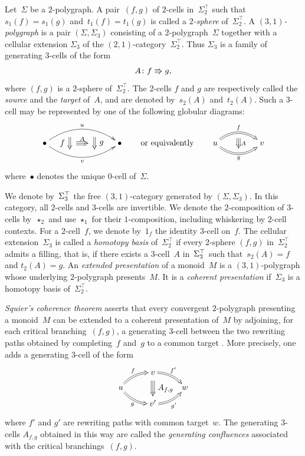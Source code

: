 \documentclass[a4paper, twoside, 11pt, english]{article}
\begin{document}
Let~$\Sigma$ be a $2$-polygraph.
A pair~$(f,g)$ of $2$-cells in~$\Sigma_2^\top$ such that~$s_1(f)=s_1(g)$ and~$t_1(f)=t_1(g)$ is called a \emph{$2$-sphere} of~$\Sigma_2^\top$.
A \emph{$(3,1)$-polygraph} is a pair $(\Sigma,\Sigma_3)$ consisting
of a $2$-polygraph~$\Sigma$ together with a cellular extension
$\Sigma_3$ of the $(2,1)$-category~$\Sigma_2^\top$. Thus
$\Sigma_3$ is a family of generating $3$-cells of the form
\[
A\colon f\Rrightarrow g,
\]
where $(f,g)$ is a $2$-sphere of~$\Sigma_2^\top$.
The $2$-cells $f$ and $g$ are respectively called the \emph{source} and the
\emph{target} of~$A$, and are denoted by~$s_2(A)$ and~$t_2(A)$.
Such a $3$-cell may be represented by one of the following globular diagrams:
\[
\xymatrix @C=8em {
\bullet
	\ar @/^4ex/ [r] ^-{u} _-{}="src"
	\ar @/_4ex/ [r] _-{v} ^-{}="tgt"
	\ar@2 "src"!<-15pt,-10pt>;"tgt"!<-15pt,10pt> _-*+{f} ^-{}="srcA"
	\ar@2 "src"!<+15pt,-10pt>;"tgt"!<+15pt,10pt> ^-*+{g} _-{}="tgtA"
	\ar@3 "srcA"!<8pt,0pt> ; "tgtA"!<-8pt,0pt> ^-{A}
&
\bullet
}
\qquad\text{or equivalently}\qquad
\xymatrix@!C@C=4.5em{
u
	\ar@2@/^3ex/ [r] ^{f} _{}="src"
	\ar@2@/_3ex/ [r] _{g} ^{}="tgt"
&
v
\ar@3 "src"!<0pt,-7pt>;"tgt"!<0pt,7pt> ^-{A}
}
\]
where~$\bullet$ denotes the unique $0$-cell of~$\Sigma$.

We denote by~$\Sigma^{\top}_3$ the free $(3,1)$-category generated by
$(\Sigma,\Sigma_3)$. In this category, all $2$-cells and $3$-cells are
invertible. 
We denote the $2$-composition of $3$-cells by~$\star_2$ and use
$\star_1$ for their $1$-composition, including whiskering by
$2$-cell contexts. For a $2$-cell~$f$, we denote by~$1_f$ the
identity $3$-cell on~$f$.
The cellular extension~$\Sigma_3$ is called a
\emph{homotopy basis} of~$\Sigma_2^\top$ if every $2$-sphere
$(f,g)$ in~$\Sigma_2^\top$ admits a filling, that is, if there exists
a $3$-cell~$A$ in~$\Sigma^{\top}_3$ such that~$s_2(A)=f$ and
$t_2(A)=g$.
An \emph{extended presentation} of a monoid~$M$ is a
$(3,1)$-polygraph whose underlying $2$-polygraph presents~$M$.
It is a \emph{coherent presentation} if~$\Sigma_3$ is a homotopy
basis of~$\Sigma_2^\top$.

\emph{Squier's coherence theorem} asserts that every convergent
$2$-polygraph presenting a monoid~$M$ can be extended to a coherent
presentation of~$M$ by adjoining, for each critical branching~$(f,g)$,
a generating $3$-cell between the two rewriting paths obtained by
completing~$f$ and~$g$ to a common target
\cite{Squier94,GuiraudMalbos18}. More precisely, one adds a generating
$3$-cell of the form
\[
\xymatrix @R=0.8em @C=2.5em @!C {
        & v
        \ar@2@/^/[dr]^-{f'}
        \ar@3[]!<0pt,-10pt>;[dd]!<0pt,10pt>
          ^-*+{A_{f,g}}
        \\
        u
        \ar@2@/^/[ur]^-{f}
        \ar@2@/_/[dr]_-{g}
        && w
        \\
        & v'
        \ar@2@/_/[ur]_-{g'}
}
\]
where $f'$ and $g'$ are rewriting paths with common target~$w$.
The generating $3$-cells $A_{f,g}$ obtained in this way are called the
\emph{generating confluences}  associated
with the critical branchings~$(f,g)$.
\end{document}
